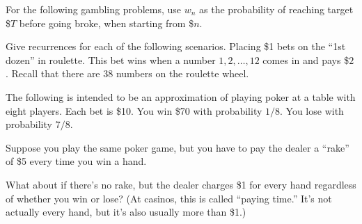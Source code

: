 \documentclass[11pt,twoside]{article}
\begin{document}
\begin{problem}
  For the following gambling problems, use $w_n$ as the
  probability of reaching target \$$T$ before going broke,
  when starting from \$$n$.  

  Give recurrences for each of the following scenarios.  
  \bparts
  \ppart Placing \$1 bets on the ``1st dozen'' in roulette.
  This bet wins when a number $1,2,\ldots,12$ comes in and pays \$$2$.
  Recall that there are $38$ numbers on the roulette wheel.

  
  \ppart The following is intended to be an approximation of playing
  poker at a table with eight players.  Each bet is \$10.  You win
  \$70 with probability $1/8$.  You lose with probability $7/8$.  

  
  \ppart Suppose you play the same poker game, but you have to pay the
  dealer a ``rake'' of \$5 every time you win a hand.
    
  \ppart What about if there's no rake, but the dealer charges \$1 for
  every hand regardless of whether you win or lose? (At casinos, this
  is called ``paying time.'' It's not actually every hand, but it's
  also usually more than \$1.) 
  \solution{
    \[ w_{n+69} = 8w_n - 7w_{n-11} \]
  }
  \eparts
\end{problem}
\end{document}
